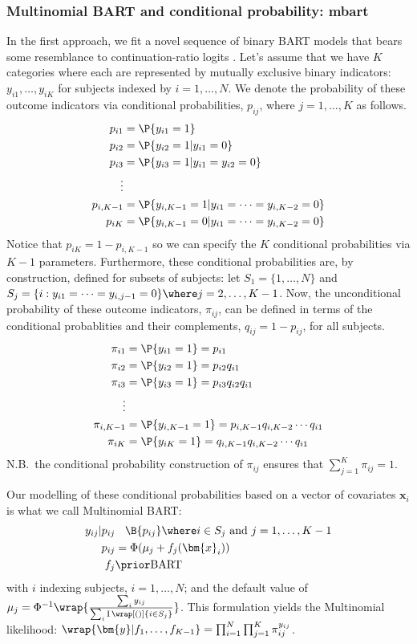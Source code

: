 \documentclass[article]{jss}
\begin{document}
\subsubsection{Multinomial BART and conditional probability: mbart}

In the first approach, we fit a novel sequence of binary BART models
that bears some resemblance to continuation-ratio logits
\citep{Agre03}.  Let's assume that we have $K$ categories where each
are represented by mutually exclusive binary indicators:
$y_{i1}, \dots, y_{iK}$ for subjects indexed by $i=1, \dots, N$.  We
denote the probability of these outcome indicators via conditional
probabilities, $p_{ij}$, where $j=1, \dots, K$ as follows.
\begin{align*}
p_{i1}&=\P{y_{i1}=1}\\
p_{i2}&=\P{y_{i2}=1|y_{i1}=0} \\
p_{i3}&=\P{y_{i3}=1|y_{i1}=y_{i2}=0} \\
\vdots & \\
p_{i,K-1}&=\P{y_{i,K-1}=1|y_{i1}=\cdots=y_{i,K-2}=0} \\
p_{iK}&=\P{y_{i,K-1}=0|y_{i1}=\cdots=y_{i,K-2}=0} 
\end{align*}
Notice that $p_{iK}=1-p_{i,K-1}$ so we can specify the $K$
conditional probabilities via $K-1$ parameters.  Furthermore, these
conditional probabilities are, by construction, defined for subsets of
subjects: let $S_1=\{1, \dots, N\}$ and
$S_j = \{ i : y_{i1}=\cdots=y_{i,j-1}=0 \} \where j=2, \dots, K-1$.
Now, the unconditional probability of these outcome indicators,
$\pi_{ij}$, can be defined in terms of the conditional probablities
and their complements, $q_{ij}=1-p_{ij}$, for all subjects.
\begin{align*}
\pi_{i1}&=\P{y_{i1}=1}=p_{i1} \\
\pi_{i2}&=\P{y_{i2}=1}=p_{i2}q_{i1} \\
\pi_{i3}&=\P{y_{i3}=1}=p_{i3}q_{i2}q_{i1} \\
\vdots & \\
\pi_{i,K-1}&=\P{y_{i,K-1}=1}=p_{i,K-1}q_{i,K-2}\cdots q_{i1} \\
\pi_{iK}&=\P{y_{iK}=1}=q_{i,K-1}q_{i,K-2}\cdots q_{i1} 
\end{align*}
N.B.\ the conditional probability construction of $\pi_{ij}$
ensures that $\sum_{j=1}^K\pi_{ij}=1$.

Our modelling of these conditional probabilities based on a vector of
covariates $\bm{x}_i$ is what we call Multinomial BART:
\begin{align*}
y_{ij}|p_{ij} &\; ~ \; \B{p_{ij}} \where i \in S_j \mbox{ and } j=1, \dots, K-1 \\
p_{ij} & = \Phi(\mu_j+f_j(\bm{x}_i)) \\
 f_j & \prior \mathrm{BART}
\end{align*}
with $i$ indexing subjects, $i=1, \dots, N$; and the default value of
$\mu_j=\Phi^{-1}\wrap{\frac{\sum_i y_{ij}}{\sum_i
    \mathrm{I}\,\wrap[()]{i \in S_j}}}$.
This formulation yields the Multinomial likelihood:
$\wrap{\bm{y}|f_1,\dots,f_{K-1}} = \prod_{i=1}^N \prod_{j=1}^K
\pi_{ij}^{y_{ij}}$.
\end{document}
